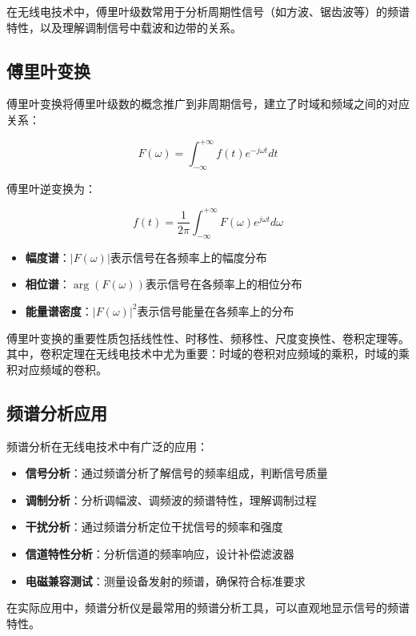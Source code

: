 \documentclass[12pt,UTF8]{ctexbook}
\begin{document}
在无线电技术中，傅里叶级数常用于分析周期性信号（如方波、锯齿波等）的频谱特性，以及理解调制信号中载波和边带的关系。

\subsection{傅里叶变换}

傅里叶变换将傅里叶级数的概念推广到非周期信号，建立了时域和频域之间的对应关系：

$$F(\omega) = \int_{-\infty}^{+\infty} f(t)e^{-j\omega t}dt$$

傅里叶逆变换为：

$$f(t) = \frac{1}{2\pi}\int_{-\infty}^{+\infty} F(\omega)e^{j\omega t}d\omega$$

\begin{itemize}[leftmargin=3.5em]
    \item \textbf{幅度谱}：$|F(\omega)|$表示信号在各频率上的幅度分布
    \item \textbf{相位谱}：$\arg(F(\omega))$表示信号在各频率上的相位分布
    \item \textbf{能量谱密度}：$|F(\omega)|^2$表示信号能量在各频率上的分布
\end{itemize}

傅里叶变换的重要性质包括线性性、时移性、频移性、尺度变换性、卷积定理等。其中，卷积定理在无线电技术中尤为重要：时域的卷积对应频域的乘积，时域的乘积对应频域的卷积。

\subsection{频谱分析应用}

频谱分析在无线电技术中有广泛的应用：

\begin{itemize}[leftmargin=3.5em]
    \item \textbf{信号分析}：通过频谱分析了解信号的频率组成，判断信号质量
    \item \textbf{调制分析}：分析调幅波、调频波的频谱特性，理解调制过程
    \item \textbf{干扰分析}：通过频谱分析定位干扰信号的频率和强度
    \item \textbf{信道特性分析}：分析信道的频率响应，设计补偿滤波器
    \item \textbf{电磁兼容测试}：测量设备发射的频谱，确保符合标准要求
\end{itemize}

在实际应用中，频谱分析仪是最常用的频谱分析工具，可以直观地显示信号的频谱特性。
\end{document}
